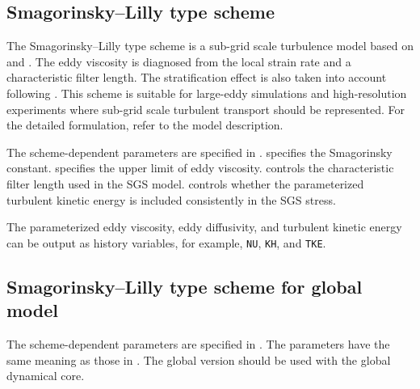 \subsection{Smagorinsky--Lilly type scheme}
\label{subsec:physics_tb_smagorinsky}
The Smagorinsky--Lilly type scheme is a sub-grid scale turbulence model based on \cite{smagorinsky1963general} and \cite{lilly1962numerical}.
The eddy viscosity is diagnosed from the local strain rate and a characteristic filter length.
The stratification effect is also taken into account following \cite{brown1994largeeddy}.
This scheme is suitable for large-eddy simulations and high-resolution experiments where sub-grid scale turbulent transport should be represented.
For the detailed formulation, refer to the model description.

The scheme-dependent parameters are specified in .
 specifies the Smagorinsky constant.
 specifies the upper limit of eddy viscosity.
 controls the characteristic filter length used in the SGS model.
 controls whether the parameterized turbulent kinetic energy is included consistently in the SGS stress.


The parameterized eddy viscosity, eddy diffusivity, and turbulent kinetic energy can be output as history variables, 
for example, \verb|NU|, \verb|KH|, and \verb|TKE|.


\subsection{Smagorinsky--Lilly type scheme for global model}
\label{subsec:physics_tb_smagorinsky_global}
The scheme-dependent parameters are specified in .
The parameters have the same meaning as those in .
The global version should be used with the global dynamical core.


